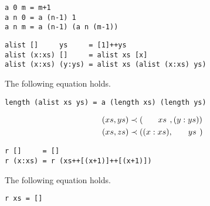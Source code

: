 \begin{verbatim}
a 0 m = m+1
a n 0 = a (n-1) 1
a n m = a (n-1) (a n (m-1))
\end{verbatim}
\begin{verbatim}
alist []     ys     = [1]++ys
alist (x:xs) []     = alist xs [x]
alist (x:xs) (y:ys) = alist xs (alist (x:xs) ys)
\end{verbatim}
\begin{claim}The following equation holds.
\begin{verbatim}
length (alist xs ys) = a (length xs) (length ys)
\end{verbatim}
\end{claim}
\begin{align*}
(xs,ys)&\prec(\hphantom{(x:\ }xs\hphantom{)},(y:ys))\\
(xs,zs)&\prec((x:xs),\hphantom{(x:\ }ys\hphantom{)})
\end{align*}
\begin{verbatim}
r []     = []
r (x:xs) = r (xs++[(x+1)]++[(x+1)])
\end{verbatim}
\begin{claim}The following equation holds.
\begin{verbatim}
r xs = []
\end{verbatim}
\end{claim}
